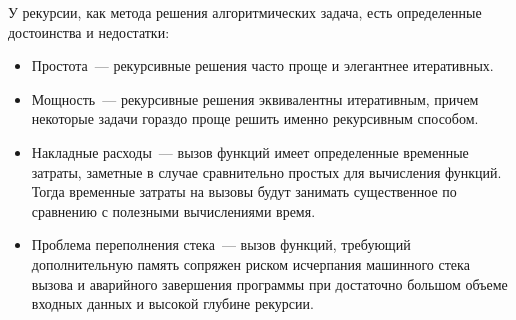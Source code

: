 У рекурсии, как метода решения алгоритмических задача, есть определенные достоинства и недостатки:
\begin{itemize}
  \item Простота~--- рекурсивные решения часто проще и элегантнее итеративных.
  \item Мощность~--- рекурсивные решения эквивалентны итеративным, причем некоторые задачи гораздо проще решить
        именно рекурсивным способом.
  \item Накладные расходы~--- вызов функций имеет определенные временные затраты, заметные в случае сравнительно
        простых для вычисления функций. Тогда временные затраты на вызовы будут занимать существенное по сравнению с
        полезными вычислениями время.
  \item Проблема переполнения стека~--- вызов функций, требующий дополнительную память сопряжен риском исчерпания машинного стека
        вызова и аварийного завершения программы при достаточно большом объеме входных данных и высокой глубине рекурсии.
\end{itemize}

